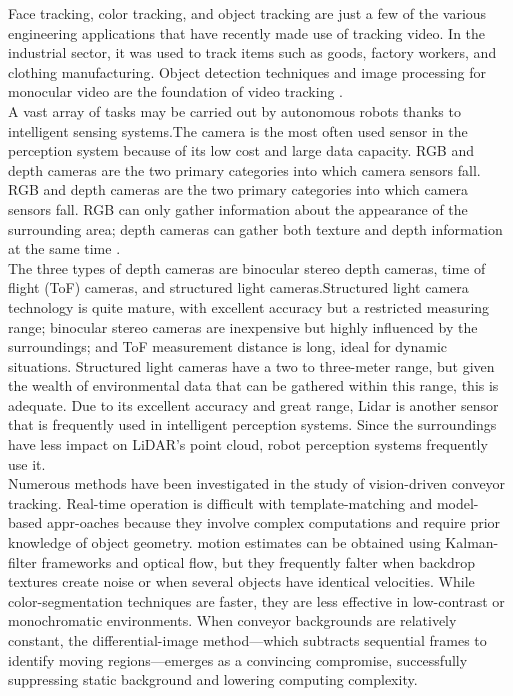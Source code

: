 \documentclass[12pt]{article}
\begin{document}
Face tracking, color tracking, and object tracking are just a few of the various engineering applications that have recently made use of tracking video.  In the industrial sector, it was used to track items such as goods, factory workers, and clothing manufacturing.  Object detection techniques and image processing for monocular video are the foundation of video tracking \cite{ref12}.\\

A vast array of tasks may be carried out by autonomous robots thanks to intelligent sensing systems.The camera is the most often used sensor in the perception system because of its low cost and large data capacity. RGB and depth cameras are the two primary categories into which camera sensors fall.  RGB and depth cameras are the two primary categories into which camera sensors fall.  RGB can only gather information about the appearance of the surrounding area; depth cameras can gather both texture and depth information at the same time \cite{ref12}.\\

The three types of depth cameras are binocular stereo depth cameras, time of flight (ToF) cameras, and structured light cameras.Structured light camera technology is quite mature, with excellent accuracy but a restricted measuring range; binocular stereo cameras are inexpensive but highly influenced by the surroundings; and ToF measurement distance is long, ideal for dynamic situations.  Structured light cameras have a two to three-meter range, but given the wealth of environmental data that can be gathered within this range, this is adequate. Due to its excellent accuracy and great range, Lidar is another sensor that is frequently used in intelligent perception systems.  Since the surroundings have less impact on LiDAR's point cloud, robot perception systems frequently use it\cite{ref12}.\\

Numerous methods have been investigated in the study of vision-driven conveyor tracking.  Real-time operation is difficult with template-matching and model-based appr-oaches because they involve complex computations and require prior knowledge of object geometry.  motion estimates can be obtained using Kalman-filter frameworks and optical flow, but they frequently falter when backdrop textures create noise or when several objects have identical velocities.  While color-segmentation techniques are faster, they are less effective in low-contrast or monochromatic environments.  When conveyor backgrounds are relatively constant, the differential-image method—which subtracts sequential frames to identify moving regions—emerges as a convincing compromise, successfully suppressing static background and lowering computing complexity\cite{ref12}.\\
\end{document}
